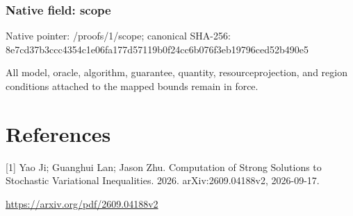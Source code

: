 \documentclass[10pt,a4paper]{article}
\begin{document}
\subsubsection{Native field: scope}


Native pointer: /proofs/1/scope; canonical SHA-256: 8e7cd37b3ccc4354c1e06fa1\allowbreak{}77d57119b0f24cc6b076f3eb\allowbreak{}19796ced52b490e5


All model, oracle, algorithm, guarantee, quantity, resourceprojection, and region conditions attached to the mapped bounds remain in force.


\section{References}


[1] Yao Ji; Guanghui Lan; Jason Zhu. Computation of Strong Solutions to Stochastic Variational Inequalities. 2026. arXiv:2609.04188v2, 2026-09-17.



\url{https://arxiv.org/pdf/2609.04188v2}
\end{document}
